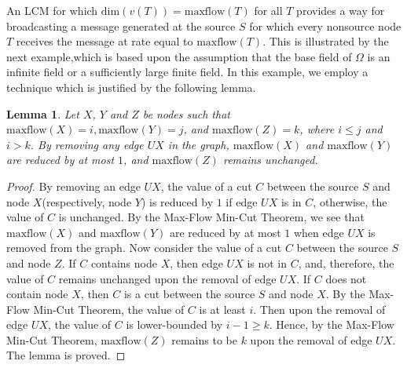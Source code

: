 \documentclass{IEEEtran}
\newtheorem{proof}{\hskip 2em Proof}
\newtheorem{lemm}{Lemma}
\begin{document}
\par An LCM for which $\text{dim}(v(T))=\text{maxflow}(T)$ for all $T$ provides a way for broadcasting a message generated at the source $S$ for which every nonsource node $T$ receives the message at rate equal to $\text{maxflow}(T)$. This is illustrated by the next example,which is based upon the assumption that the base field of $\Omega$ is an infinite field or a sufficiently large finite field. In this example, we employ a technique which is justified by the following lemma.
\begin{lemm}
	Let $X$, $Y$ and $Z$ be nodes such that $\text{maxflow}(X)=i,\text{maxflow}(Y)=j$, and $\text{maxflow}(Z)=k$, where $i\leq j$ and $i>k$. By removing any edge $UX$ in the graph, $\text{maxflow}(X)$ and $\text{maxflow}(Y)$ are reduced by at most $1$, and $\text{maxflow}(Z)$ remains unchanged.
\end{lemm}
\begin{proof}
	By removing an edge $UX$, the value of a cut $C$ between the source $S$ and node $X$(respectively, node $Y$) is reduced by $1$ if edge $UX$ is in $C$, otherwise, the value of $C$ is unchanged. By the Max-Flow Min-Cut Theorem, we see that $\text{maxflow}(X)$ and $\text{maxflow}(Y)$ are reduced by at most $1$ when edge $UX$ is removed from the graph. Now consider the value of a cut $C$ between the source $S$ and node $Z$. If $C$ contains node $X$, then edge $UX$ is not in $C$, and, therefore, the value of $C$ remains 	unchanged upon the removal of edge $UX$. If $C$ does not contain node $X$, then $C$ is a cut between the source $S$ and node $X$. By the Max-Flow Min-Cut Theorem, the value of $C$ is at least $i$. Then upon the removal of edge $UX$, the value of $C$ is lower-bounded by $i-1\geq k$. Hence, by the Max-Flow Min-Cut Theorem, $\text{maxflow}(Z)$ remains to be $k$ upon the removal of edge $UX$. The lemma is proved.
\end{proof}
\end{document}
